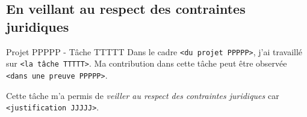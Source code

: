 \documentclass[%
    10pt,%
    usenames,%
    dvipsnames%
]{beamer}
\begin{document}
\subsection{En veillant au respect des contraintes
juridiques}\label{en-veillant-au-respect-des-contraintes-juridiques}

\begin{frame}[fragile]{Projet PPPPP - Tâche TTTTT}
\label{projet-ppppp---tuxe2che-ttttt-22}
Dans le cadre \texttt{\textless{}du\ projet\ PPPPP\textgreater{}}, j'ai
travaillé sur \texttt{\textless{}la\ tâche\ TTTTT\textgreater{}}. Ma
contribution dans cette tâche peut être observée
\texttt{\textless{}dans\ une\ preuve\ PPPPP\textgreater{}}.

Cette tâche m'a permis de \emph{veiller au respect des contraintes
juridiques} car \texttt{\textless{}justification\ JJJJJ\textgreater{}}.
\end{frame}


\maketitle
\end{document}
